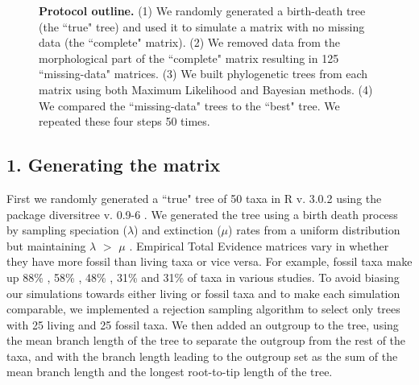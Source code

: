 \documentclass[10pt,letterpaper]{article}
\begin{document}
\begin{figure}[h]
\caption{{\bf Protocol outline.}
(1) We randomly generated a birth-death tree (the ``true" tree) and used it to simulate a matrix with no missing data (the ``complete" matrix).
(2) We removed data from the morphological part of the ``complete" matrix resulting in 125 ``missing-data" matrices.
(3) We built phylogenetic trees from each matrix using both Maximum Likelihood and Bayesian methods.
(4) We compared the ``missing-data" trees to the ``best" tree.
We repeated these four steps 50 times.}
\label{Fig_Outline}
\end{figure}


\subsection*{1. Generating the matrix}
\label{Generating_the_matrix}
First we randomly generated a ``true" tree of 50 taxa in R v. 3.0.2 \cite{R302} using the package diversitree v. 0.9-6 \cite{fitzjohndiversitree2012}. We generated the tree using a birth death process by sampling speciation ($\lambda$) and extinction ($\mu$) rates from a uniform distribution but maintaining $\lambda$ $>$ $\mu$ \cite{paradistime-dependent2011}. Empirical Total Evidence matrices vary in whether they have more fossil than living taxa or vice versa. For example, fossil taxa make up 88\% \cite{beckancient2014}, 58\% \cite{schragocombining2013}, 48\% \cite{pyrondivergence2011}, 31\% \cite{ronquista2012} and 31\% \cite{slaterphylogenetic2013} of taxa in various studies. To avoid biasing our simulations towards either living or fossil taxa and to make each simulation comparable, we implemented a rejection sampling algorithm to select only trees with 25 living and 25 fossil taxa. We then added an outgroup to the tree, using the mean branch length of the tree to separate the outgroup from the rest of the taxa, and with the branch length leading to the outgroup set as the sum of the mean branch length and the longest root-to-tip length of the tree.
\end{document}
